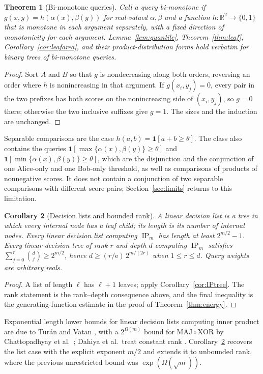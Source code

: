 \documentclass[11pt]{article}
\newtheorem{theorem}{Theorem}[section]
\newtheorem{corollary}[theorem]{Corollary}
\theoremstyle{definition}
\newcommand{\bits}{\{0,1\}}
\newcommand{\R}{\mathbb R}
\newcommand{\ind}[1]{\mathbf 1[#1]}
\newcommand{\ip}{\operatorname{IP}}
\newcommand{\Eul}{\mathrm e}
\begin{document}
\begin{theorem}[Bi-monotone queries]\label{thm:bimonotone}
Call a query \emph{bi-monotone} if \(g(x,y)=h(\alpha(x),\beta(y))\) for real-valued \(\alpha,\beta\) and a function \(h:\R^2\to\bits\) that is monotone in each argument separately, with a fixed direction of monotonicity for each argument. Lemma~\ref{lem:quantile}, Theorem~\ref{thm:leaf}, Corollary~\ref{cor:leafarea}, and their product-distribution forms hold verbatim for binary trees of bi-monotone queries.
\end{theorem}
\begin{proof}
Sort \(A\) and \(B\) so that \(g\) is nondecreasing along both orders, reversing an order where \(h\) is nonincreasing in that argument. If \(g(x_i,y_j)=0\), every pair in the two prefixes has both scores on the nonincreasing side of \((x_i,y_j)\), so \(g=0\) there; otherwise the two inclusive suffixes give \(g=1\). The sizes and the induction are unchanged.
\end{proof}

Separable comparisons are the case \(h(a,b)=\ind{a+b\ge\theta}\). The class also contains the queries \(\ind{\max\{\alpha(x),\beta(y)\}\ge\theta}\) and \(\ind{\min\{\alpha(x),\beta(y)\}\ge\theta}\), which are the disjunction and the conjunction of one Alice-only and one Bob-only threshold, as well as comparisons of products of nonnegative scores. It does not contain a conjunction of two separable comparisons with different score pairs; Section~\ref{sec:limits} returns to this limitation.

\begin{corollary}[Decision lists and bounded rank]\label{cor:lists}
A linear decision list is a tree in which every internal node has a leaf child; its length is its number of internal nodes. Every linear decision list computing \(\ip_m\) has length at least \(2^{m/2}-1\). Every linear decision tree of rank \(r\) and depth \(d\) computing \(\ip_m\) satisfies \(\sum_{j=0}^{r}\binom dj\ge2^{m/2}\), hence \(d\ge(r/\Eul)\,2^{m/(2r)}\) when \(1\le r\le d\). Query weights are arbitrary reals.
\end{corollary}
\begin{proof}
A list of length \(\ell\) has \(\ell+1\) leaves; apply Corollary~\ref{cor:IPtree}. The rank statement is the rank--depth consequence above, and the final inequality is the generating-function estimate in the proof of Theorem~\ref{thm:energy}.
\end{proof}

Exponential length lower bounds for linear decision lists computing inner product are due to Tur\'an and Vatan \cite{TV97}, with a \(2^{\Omega(m)}\) bound for \(\mathrm{MAJ}\circ\mathrm{XOR}\) by Chattopadhyay et al.~\cite{CMMS20}; Dahiya et al.\ treat constant rank \cite{Dahiya23}. Corollary~\ref{cor:lists} recovers the list case with the explicit exponent \(m/2\) and extends it to unbounded rank, where the previous unrestricted bound was \(\exp(\Omega(\sqrt m))\).
\end{document}

